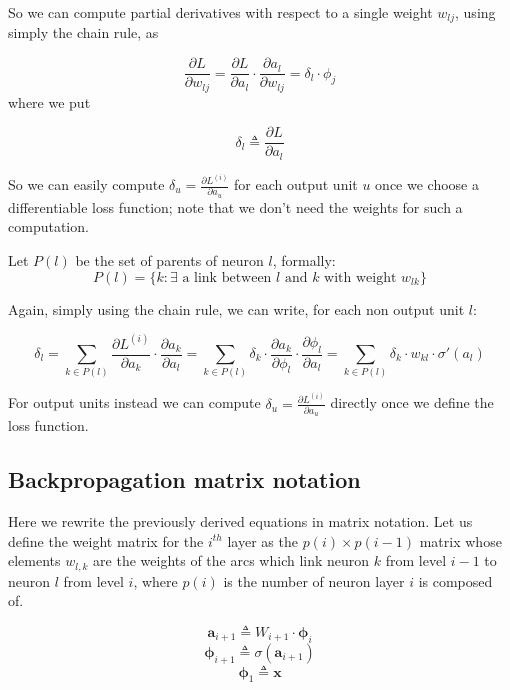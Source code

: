 \documentclass{article}
\renewcommand{\vec}[1]{\boldsymbol{#1}}
\begin{document}
So we can compute partial derivatives with respect to a single weight $w_{lj}$, using simply the chain rule, as 

$$\frac{\partial L}{\partial w_{lj}}=\frac{\partial L}{\partial a_l} \cdot \frac{\partial a_l}{\partial w_{lj}}=\delta_l \cdot \phi_j$$
where we put

\begin{equation}
\delta_l \triangleq \frac{\partial L}{\partial a_l}
\end{equation}



So we can easily compute $\delta_u = \frac{\partial L^{(i)}}{\partial a_u} $ for each output unit $u$ once we choose a differentiable loss function; note
that we don't need the weights for such a computation. 

Let $P(l)$ be the set of parents of neuron $l$, formally:
\begin{equation} 
P(l) = \{ k: \exists \text{ a link between $l$ and $k$ with weight } w_{lk} \}
\end{equation}

Again, simply using the chain rule, we can write, for each non output unit $l$:

\begin{equation}
\label{loss_deriv}
\delta_l = \sum_{k\in P(l)} \frac{\partial L^{(i)}}{\partial a_k} \cdot \frac{\partial a_k}{\partial a_l}= \sum_{k\in P(l)} \delta_k \cdot 
\frac{\partial a_k}{\partial \phi_l} \cdot \frac{\partial \phi_l}{\partial a_l} = \sum_{k\in P(l)} \delta_k \cdot 
w_{kl} \cdot \sigma'(a_l)
\end{equation}


For output units instead we can compute $\delta_u = \frac{\partial L^{(i)}}{\partial a_u} $ directly once we define the loss function.

\subsection{Backpropagation matrix notation}

Here we rewrite the previously derived equations in matrix notation.
Let us define the weight matrix for the $i^{th}$ layer as the $p(i) \times p(i-1)$ matrix whose elements $w_{l,k}$ are the weights of the arcs which link neuron $k$ from level $i-1$ to neuron $l$ from level $i$, where
$p(i)$ is the number of neuron layer $i$ is composed of.

\begin{equation}
 \vec{a}_{i+1} \triangleq W_{i+1} \cdot \vec{\phi}_i
\end{equation}
\begin{equation}
 \vec{\phi}_{i+1} \triangleq \sigma(\vec{a}_{i+1})
\end{equation}
\begin{equation}
 \vec{\phi}_1 \triangleq \vec{x}
\end{equation}
\end{document}
